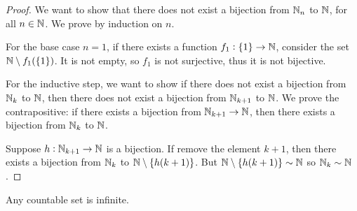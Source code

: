 \begin{proof}
We want to show that there does not exist a bijection from $\mathbb N_n$ to $\mathbb N$, for all $n\in\mathbb N$. We prove by induction on $n$.

For the base case $n=1$, if there exists a function $f_1:\{1\}\to\mathbb N$, consider the set $\mathbb N\setminus f_1(\{1\})$. It is not empty, so $f_1$ is not surjective, thus it is not bijective.

For the inductive step, we want to show if there does not exist a bijection from $\mathbb N_k$ to $\mathbb N$, then there does not exist a bijection from $\mathbb N_{k+1}$ to $\mathbb N$. We prove the contrapositive: if there exists a bijection from $\mathbb N_{k+1}\to\mathbb N$, then there exists a bijection from $\mathbb N_k$ to $\mathbb N$.

Suppose $h:\mathbb N_{k+1}\to\mathbb N$ is a bijection. If remove the element $k+1$, then there exists a bijection from $\mathbb N_k$ to $\mathbb N\setminus\{h(k+1)\}$. But $\mathbb N\setminus\{h(k+1)\}\sim\mathbb N$ so $\mathbb N_k\sim\mathbb N$.
\end{proof}

\begin{corollary}
Any countable set is infinite.
\end{corollary}

